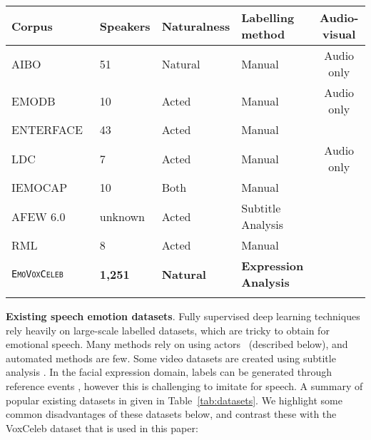 \documentclass[sigconf]{acmart}
\newcommand{\datasetName}{\textsc{EmoVoxCeleb}}
\begin{document}
\begin{table*}[ht]
\setlength{\tabcolsep}{0.7em} \begin{tabular}{llllc}
\multicolumn{1}{l}{Corpus}&\multicolumn{1}{l}{Speakers}&\multicolumn{1}{l}{Naturalness} & \multicolumn{1}{l}{Labelling method}&\multicolumn{1}{c}{Audio-visual}  \\   \hline         
AIBO~\cite{batliner2004you}  &  51 & Natural  &  Manual & Audio only \\
EMODB~\cite{burkhardt2005database}  & 10  & Acted  & Manual &  Audio only \\
ENTERFACE~\cite{martin2006enterface}  & 43  & Acted  &  Manual &  \\
LDC~\cite{liberman2002ldc}  & 7  & Acted  &  Manual & Audio only \\
IEMOCAP~\cite{busso2008iemocap}  & 10  & Both  & Manual &  \\
AFEW 6.0~\cite{dhall2012collecting}  & unknown & Acted  &  Subtitle Analysis &  \\
RML  &  8 & Acted  &  Manual &  \\
{\tt \datasetName{}}  &  \textbf{1,251} &  \textbf{Natural} & \textbf{Expression Analysis} & \\  \hline         
\vspace{5pt}   
\end{tabular}
\caption{Comparison to existing public domain speech emotion datasets.  contains both improvised and scripted speech.  contains only emotional
speech of children.  has not been commonly used for audio only classification, but is popular for audio-visual fusion methods.  identity labels are not provided. }
\label{tab:datasets}
\end{table*} 
\noindent \textbf{Existing speech emotion datasets}.
Fully supervised deep learning techniques rely heavily on large-scale labelled datasets, which are tricky to obtain for emotional speech. Many methods rely on using actors~\cite{burkhardt2005database,martin2006enterface,liberman2002ldc,busso2008iemocap} (described below), and automated methods are few. Some video datasets are created using subtitle analysis \cite{dhall2012collecting}. In the facial expression domain, labels can be generated through reference events \cite{Albanie16}, however this is challenging to imitate for speech. A summary of popular existing datasets in given in Table~\ref{tab:datasets}. We highlight some common disadvantages of these datasets below, and contrast these with
the VoxCeleb dataset that is used in this paper:
\end{document}
